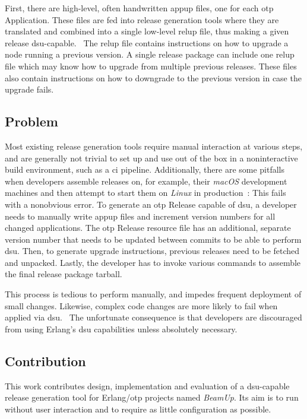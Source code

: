 First, there are high-level, often handwritten \acrfull{appup} files, one for each \acrshort{otp} Application. These files are fed into release generation tools where they are translated and combined into a single low-level \acrshort{relup} file, thus making a given release \acrshort{dsu}-capable.~\cite{doc:otp} The \acrshort{relup} file contains instructions on how to upgrade a node running a previous version. A single release package can include one \acrshort{relup} file which may know how to upgrade from multiple previous releases. These files also contain instructions on how to downgrade to the previous version in case the upgrade fails.~\cite{doc:otp}

\subsection{Problem}\label{sec:problem} Most existing release generation tools require manual interaction at various steps, and are generally not trivial to set up and use out of the box in a noninteractive build environment, such as a \acrfull{ci} pipeline. Additionally, there are some pitfalls when developers assemble releases on, for example, their \emph{macOS} development machines and then attempt to start them on \emph{Linux} in production~\cite{cesarini:otp}: This fails with a nonobvious error. To generate an \acrshort{otp} Release capable of \acrshort{dsu}, a developer needs to manually write \acrshort{appup} files and increment version numbers for all changed applications. The \acrshort{otp} Release resource file has an additional, separate version number that needs to be updated between commits to be able to perform \acrshort{dsu}. Then, to generate upgrade instructions, previous releases need to be fetched and unpacked. Lastly, the developer has to invoke various commands to assemble the final release package tarball.~\cite{ferd}

This process is tedious to perform manually, and impedes frequent deployment of small changes. Likewise, complex code changes are more likely to fail when applied via \acrshort{dsu}.~\cite{hicks} The unfortunate consequence is that developers are discouraged from using Erlang's \acrshort{dsu} capabilities unless absolutely necessary.~\cite{ferd}

\subsection{Contribution}

This work contributes design, implementation and evaluation of a \acrshort{dsu}-capable release generation tool for Erlang/\acrshort{otp} projects named \emph{BeamUp}. Its aim is to run without user interaction and to require as little configuration as possible.

